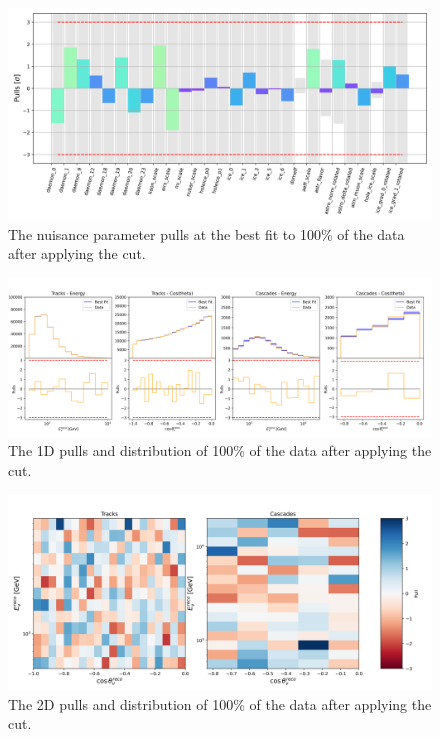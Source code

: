 \documentclass[main.tex]{subfiles}
\begin{document}
\begin{figure}
    \centering
    \includegraphics[width=0.9\linewidth]{./figures/blindfit/pulls_IC86_data_full_cut_joint_data_full_cut.png}
    \caption{The nuisance parameter pulls at the best fit to 100\% of the data after applying the cut.}\label{fig:pulls_100p_cut}
\end{figure}

\begin{figure}
    \centering
    \includegraphics[width=0.9\linewidth]{./figures/blindfit/goodness_joint_data_full_cut_IC86_data_full_cut.png}
    \caption{The 1D pulls and distribution of 100\% of the data after applying the cut.}\label{fig:1d_100p_distrib_cut}
\end{figure}

\begin{figure}
    \centering
    \includegraphics[width=0.9\linewidth]{./figures/blindfit/2dpulls_joint_data_full_cut_IC86_data_full_cut.png}
    \caption{The 2D pulls and distribution of 100\% of the data after applying the cut.}\label{fig:2d_100p_distrib_cut}
\end{figure}
\end{document}

